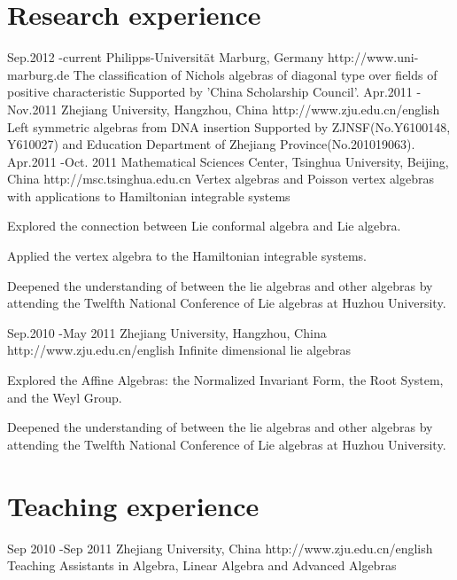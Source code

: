 \documentclass[10pt]{article} %
\begin{document}

\section{Research experience}

\job
{Sep.2012 -}{current}
{Philipps-Universität Marburg, Germany}
{http://www.uni-marburg.de}
{The classification of Nichols algebras of diagonal type over fields of positive characteristic}
{Supported by 'China Scholarship Council'.}
\job
{Apr.2011 -}{Nov.2011}
{Zhejiang University, Hangzhou, China}
{http://www.zju.edu.cn/english}
{Left symmetric algebras from DNA insertion}
{Supported by ZJNSF(No.Y6100148, Y610027) and Education Department of Zhejiang Province(No.201019063).}
\job
{Apr.2011 -}{Oct. 2011}
{Mathematical Sciences Center, Tsinghua University, Beijing, China}
{http://msc.tsinghua.edu.cn}
{Vertex algebras and Poisson vertex algebras with applications to Hamiltonian integrable systems}
{\begin{itemize-noindent}
\item{Explored the connection between Lie conformal algebra and Lie algebra.}
\item{Applied the vertex algebra to the Hamiltonian integrable systems.}	
\item{Deepened the understanding of between the lie algebras and other algebras by attending the Twelfth National Conference of Lie algebras at Huzhou University.}
\end{itemize-noindent}
}
\job
{Sep.2010 -}{May 2011}
{Zhejiang University, Hangzhou, China}
{http://www.zju.edu.cn/english}
{Infinite dimensional lie algebras}
{\begin{itemize-noindent}
\item{Explored the Affine Algebras: the Normalized Invariant Form, the Root System, and the Weyl Group.}
\item{Deepened the understanding of between the lie algebras and other algebras by attending the Twelfth National Conference of Lie algebras at Huzhou University.}
\end{itemize-noindent}
}

\section{Teaching experience}
\job
{Sep 2010 -}{Sep 2011}
{Zhejiang University, China}
{http://www.zju.edu.cn/english}
{Teaching Assistants in Algebra, Linear Algebra and Advanced Algebras}
\end{document}

